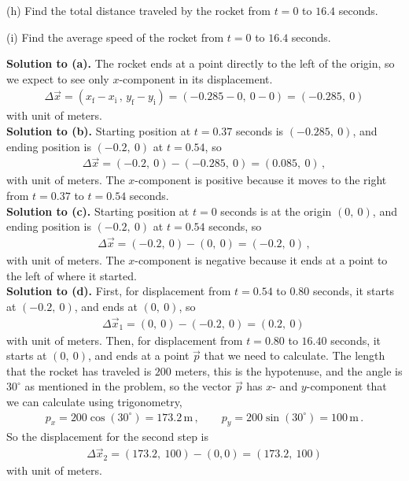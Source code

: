 \documentclass[11pt]{article}
\begin{document}
\noindent(h) Find the total distance traveled by the rocket from $t = 0$ to $ 16.4$ seconds.\\ 
\hfill\newline\hfill\newline\hfill\newline
\hfill\newline\hfill

\noindent(i) Find the average speed of the rocket from $t = 0$ to $ 16.4$ seconds. 

\newpage
\textbf{Solution to (a).} The rocket ends at a point directly to the left of the origin, so we expect to see only $x$-component in its displacement. 
\begin{align*}
\Delta \vec{x} = (x_{\text{f}}-x_{\text{i}}\, ,\, y_{\text{f}}-y_{\text{i}}) = (-0.285 - 0,\ 0-0) = (-0.285,\ 0)
\end{align*}
with unit of meters.\\

\textbf{Solution to (b).} Starting position at $t=0.37$ seconds is $(-0.285,\ 0)$, and ending position is $(-0.2,\ 0)$ at $t = 0.54$, so
\begin{align*}
\Delta \vec{x} = (-0.2,\ 0) - (-0.285,\ 0) = (0.085, \ 0)\,,
\end{align*}
with unit of meters. The $x$-component is positive because it moves to the right from $t=0.37$ to $t=0.54$ seconds.\\

\textbf{Solution to (c).}  Starting position at $t=0$ seconds is at the origin $(0,\ 0)$, and ending position is $(-0.2,\ 0)$ at $t = 0.54$ seconds, so
\begin{align*}
\Delta \vec{x} = (-0.2,\ 0) - (0,\ 0) = (-0.2, \ 0)\,,
\end{align*}
with unit of meters. The $x$-component is negative because it ends at a point to the left of where it started.\\

\textbf{Solution to (d).} First, for displacement from $t=0.54$ to $0.80$ seconds, it starts at $(-0.2,\ 0)$, and ends at $(0,\ 0)$, so 
\begin{align*}
\Delta \vec{x}_1 = (0,\ 0) - (-0.2,\ 0) = (0.2, \ 0)\,
\end{align*}
with unit of meters. Then, for displacement from $t=0.80$ to $16.40$ seconds, it starts at $(0,\ 0)$, and ends at a point $\vec{p}$ that we need to calculate. The length that the rocket has traveled is $200$ meters, this is the hypotenuse, and the angle is $30^\circ$ as mentioned in the problem, so the vector $\vec{p}$ has $x$- and $y$-component that we can calculate using trigonometry, 
\begin{align*}
p_x = 200 \cos(30^\circ) = 173.2\,\text{m}\,,\qquad
p_y = 200 \sin(30^\circ) = 100 \,\text{m}\,.
\end{align*}
So the displacement for the second step is
\begin{align*}
\Delta\vec{x}_2 = ( 173.2,\ 100) -(0,0) =( 173.2,\ 100)
\end{align*}
with unit of meters. \\
\end{document}
